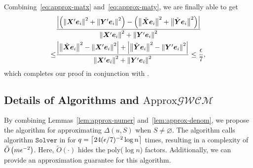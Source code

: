 \documentclass[10pt,twocolumn,twoside]{IEEEtran}
\begin{document}
\begin{IEEEproof}
\begin{equation}
    \end{equation}
    Combining~\eqref{eq:approx-matx} and~\eqref{eq:approx-maty}, we are finally able to get
    \begin{align*}
            & \frac{\left|\left( \left\Vert\boldsymbol{X}'\boldsymbol{e}_i\right\Vert^2+\left\Vert\boldsymbol{Y}'\boldsymbol{e}_i\right\Vert^2 \right)-\left( \left\Vert\tilde{\boldsymbol{X}}\boldsymbol{e}_i\right\Vert^2+\left\Vert\tilde{\boldsymbol{Y}}\boldsymbol{e}_i\right\Vert^2 \right) \right|}{\left\Vert\boldsymbol{X}'\boldsymbol{e}_i\right\Vert^2+\left\Vert\boldsymbol{Y}'\boldsymbol{e}_i\right\Vert^2}             \\
        \le & \frac{\left|\left\Vert\tilde{\boldsymbol{X}}\boldsymbol{e}_i\right\Vert^2-\left\Vert\boldsymbol{X}'\boldsymbol{e}_i\right\Vert^2 \right|+\left|\left\Vert\tilde{\boldsymbol{Y}}\boldsymbol{e}_i\right\Vert^2-\left\Vert\boldsymbol{Y}'\boldsymbol{e}_i\right\Vert^2 \right|}{\left\Vert\boldsymbol{X}'\boldsymbol{e}_i\right\Vert^2+\left\Vert\boldsymbol{Y}'\boldsymbol{e}_i\right\Vert^2}\le\frac{\epsilon}{7},
    \end{align*}
    which completes our proof in conjunction with .
\end{IEEEproof}

\subsection{Details of Algorithms  and \(\text{Approx}\mathcal{GWCM}\)}

By combining Lemmas~\ref{lem:approx-numer} and~\ref{lem:approx-denom}, we propose the  algorithm for approximating \(\Delta(u,S)\) when \(S\neq\varnothing\).
The  algorithm calls algorithm \(\mathtt{Solver}\) in  for \(q=\left\lceil24(\epsilon/7)^{-2}\log n\right\rceil\) times, resulting in a complexity of \(\tilde{O}\left( m\epsilon^{-2} \right)\).
Here, \(\tilde{O}(\cdot)\) hides the poly(\(\log n\)) factors.
Additionally, we can provide an approximation guarantee for this algorithm.
\end{document}
